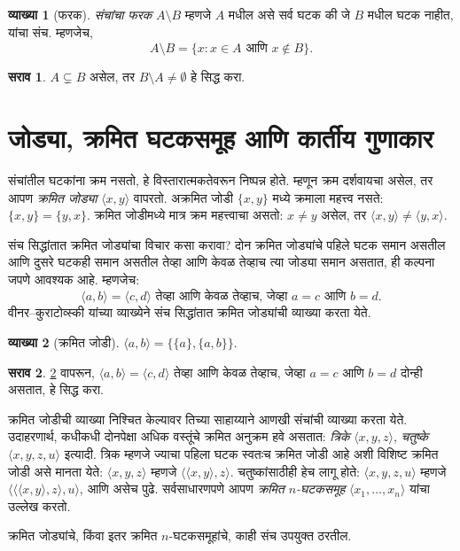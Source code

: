 \documentclass[11pt,a4paper,openany]{book}
\theoremstyle{definition}
\newtheorem{defn}{व्याख्या}[section]
\newtheorem{prob}{सराव}[chapter]
\newenvironment{explain}{}{}
\newcommand{\Setabs}[2]{\{#1:#2\}}
\newcommand{\tuple}[1]{\langle #1\rangle}
\begin{document}
\begin{defn}[फरक]
\emph{संचांचा फरक} $A \setminus B$ म्हणजे $A$ मधील असे सर्व
घटक की जे $B$ मधील घटक नाहीत, यांचा संच. म्हणजेच,
\[
A\setminus B = \Setabs{x}{x\in A \text{ आणि } x \notin B}.
\]
\end{defn}

\begin{prob}
	$A \subsetneq B$ असेल, तर $B \setminus A \neq \emptyset$ हे सिद्ध करा.
\end{prob}











\section{जोड्या, क्रमित घटकसमूह आणि कार्तीय गुणाकार}\label{sfr:set:pai:sec}

\begin{explain}
संचांतील घटकांना क्रम नसतो, हे विस्तारात्मकतेवरून निष्पन्न होते.
म्हणून क्रम दर्शवायचा असेल, तर आपण \emph{क्रमित जोड्या} $\tuple{x, y}$ वापरतो.
अक्रमित जोडी $\{x, y\}$ मध्ये क्रमाला महत्त्व नसते:
$\{x, y\} = \{y, x\}$. क्रमित जोडीमध्ये मात्र क्रम महत्त्वाचा असतो:
$x
\neq y$ असेल, तर $\tuple{x, y} \neq \tuple{y, x}$.

संच सिद्धांतात क्रमित जोड्यांचा विचार कसा करावा? दोन क्रमित जोड्यांचे
पहिले घटक समान असतील आणि दुसरे घटकही समान असतील तेव्हा आणि केवळ तेव्हाच
त्या जोड्या समान असतात, ही कल्पना जपणे आवश्यक आहे. म्हणजेच:
\[
  \tuple{a, b}= \tuple{c, d}\text{ तेव्हा आणि केवळ तेव्हाच, जेव्हा }a = c \text{ आणि }b=d.
\]
वीनर--कुराटोव्स्की यांच्या व्याख्येने संच सिद्धांतात क्रमित जोड्यांची व्याख्या करता येते.
\end{explain}

\begin{defn}[क्रमित जोडी]\label{sfr:set:pai:wienerkuratowski}
	$\tuple{a, b} = \{\{a\}, \{a, b\}\}$.
\end{defn}

\begin{prob}
	\ref{sfr:set:pai:wienerkuratowski} वापरून, $\tuple{a,
	b}= \tuple{c, d}$ तेव्हा आणि केवळ तेव्हाच, जेव्हा $a = c$ आणि $b=d$
दोन्ही असतात, हे सिद्ध करा.
\end{prob}

\begin{explain}
क्रमित जोडीची व्याख्या निश्चित केल्यावर तिच्या साहाय्याने आणखी संचांची
व्याख्या करता येते. उदाहरणार्थ, कधीकधी दोनपेक्षा अधिक वस्तूंचे क्रमित
अनुक्रम हवे असतात: \emph{त्रिके} $\tuple{x, y, z}$,
\emph{चतुष्के} $\tuple{x, y, z, u}$ इत्यादी.
त्रिक म्हणजे ज्याचा पहिला घटक स्वतःच क्रमित जोडी आहे अशी विशिष्ट क्रमित
जोडी असे मानता येते: $\tuple{x, y, z}$ म्हणजे $\tuple{\tuple{x, y},z}$.
चतुष्कांसाठीही हेच लागू होते: $\tuple{x,y,z,u}$ म्हणजे
$\tuple{\tuple{\tuple{x,y},z},u}$, आणि असेच पुढे.
सर्वसाधारणपणे आपण \emph{क्रमित $n$-घटकसमूह} $\tuple{x_1, \dots, x_n}$ यांचा उल्लेख करतो.

क्रमित जोड्यांचे, किंवा इतर क्रमित $n$-घटकसमूहांचे, काही संच उपयुक्त ठरतील.
\end{explain}
\end{document}
